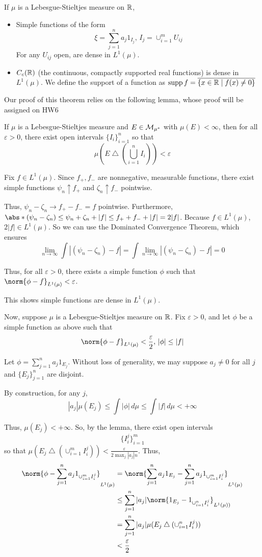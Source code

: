 \documentclass[x11names,reqno,14pt]{extarticle}
\newcommand*{\oo}{\infty}
\begin{document}
If $\mu$ is a Lebesgue-Stieltjes measure on $\mathbb{R}$, 
\begin{itemize}
\item Simple functions of the form
\[
\xi = \sum_{j=1}^na_j1_{I_j},\, I_j = \cup_{i=1}^mU_{ij}
\]
For any $U_{ij}$ open, are dense in $L^1(\mu)$.
\item $C_c(\mathbb{R})$ (the continuous, compactly supported real functions) is dense in $L^1(\mu)$. We define the support of a function as $\operatorname{supp} f = \overline{\{x \in \mathbb{R} \mid f(x) \neq0\}}$
\end{itemize}

Our proof of this theorem relies on the following lemma, whose proof will be assigned on HW6

\lem

If $\mu$ is a Lebesgue-Stieltjes measure and $E \in \mathcal{M}_{\mu^*}$ with $\mu(E)<\oo$, then for all $\varepsilon>0$, there exist open intervals $\{I_i\}_{i=1}^n$ so that 
\[
\mu\left(E \bigtriangleup \left(\bigcup_{i=1}^nI_i\right)\right) < \varepsilon
\]

\proof

Fix $f \in L^1(\mu)$. Since $f_+, f_-$ are nonnegative, measurable functions, there exist simple functions $\psi_n\uparrow f_+$ and $\zeta_n\uparrow f_-$ pointwise. 

Thus, $\psi_n - \zeta_n \to f_+ - f_- = f$ pointwise. Furthermore, $\abs*{(\psi_n - \zeta_n)} \leq \psi_n + \zeta_n + |f| \leq f_+ + f_- + |f| = 2|f|$. Because $f \in L^1(\mu)$, $2|f| \in L^1(\mu)$. So we can use the Dominated Convergence Theorem, which ensures 
\[
\lim_{n\to\oo}\int|(\psi_n - \zeta_n) - f| = \int\lim_{n\to\oo}|(\psi_n - \zeta_n) - f| = 0 
\]

Thus, for all $\varepsilon>0$, there exists a simple function $\phi$ such that $\norm{\phi - f}_{L^1(\mu)} < \varepsilon$. 

This shows simple functions are dense in $L^1(\mu)$. 

Now, suppose $\mu$ is a Lebesgue-Stieltjes measure on $\mathbb{R}$. Fix $\varepsilon>0$, and let $\phi$ be a simple function as above such that
\[
\norm{\phi - f}_{L^1(\mu)} < \frac{\varepsilon}{2}, \, |\phi|\leq|f|
\]

Let $\phi = \sum_{j=1}^na_j1_{E_j}$. Without loss of generality, we may suppose $a_j \neq0$ for all $j$ and $\{E_j\}_{j=1}^n$ are disjoint. 

By construction, for any $j$,
\[
|a_j|\mu(E_j) \leq \int|\phi|\,d\mu \leq \int |f|\,d\mu < +\oo
\]

Thus, $\mu(E_j) < +\oo$. So, by the lemma, there exist open intervals 
\[
\{I_i^j\}_{i=1}^m
\]
so that $\mu(E_j \bigtriangleup (\cup_{i=1}^mI_i^j)) < \frac{\varepsilon}{2\max_j |a_j|n}$. 
Thus, 
\begin{align*}
\norm{\phi - \sum_{j=1}^na_j1_{\cup_{i=1}^mI_i^j}}_{L^1(\mu)} & = \norm{\sum_{j=1}^na_j1_{E_j} - \sum_{j=1}^na_j1_{\cup_{i=1}^mI_i^j}}_{L^1(\mu)} \\
& \leq \sum_{j=1}^n|a_j|\norm{1_{E_j} - 1_{\cup_{i=1}^nI_i^j}}_{L^1(\mu))} \\
& = \sum_{j=1}^n|a_j|\mu(E_j \bigtriangleup (\cup_{i=1}^nI_i^j)) \\
& < \frac{\varepsilon}{2}
\end{align*}
\end{document}
